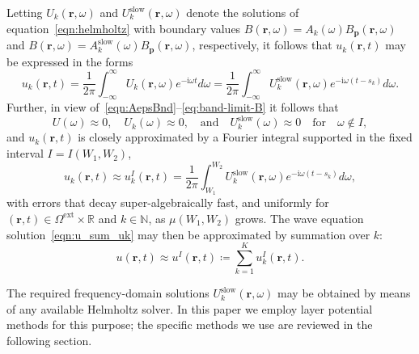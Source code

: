 \documentclass[11pt]{article}
\theoremstyle{plain}
\theoremstyle{remark}
\def \br{\mathbf{r}}
\def \bp{\mathbf{p}}
\begin{document}
Letting $U_k(\br,\omega)$ and $U_k^{\mathrm{slow}}(\br,\omega)$ denote
the solutions of equation~\eqref{eqn:helmholtz} with boundary values
$B(\br,\omega) = A_k(\omega)B_\bp(\br,\omega) $ and
$B(\br,\omega) = A_k^{\mathrm{slow}}(\omega)B_\bp(\br,\omega) $, respectively, it follows that $u_k(\br,t)$ may be expressed
in the forms
\begin{equation}\label{wind_uk}
    u_k(\br,t) = \frac{1}{2\pi}\int_{-\infty}^{\infty}U_k(\br,\omega)e^{-\mathrm{i}\omega t}d\omega = \frac{1}{2\pi}\int_{-\infty}^{\infty}U_k^{\mathrm{slow}}(\br,\omega)e^{-\mathrm{i}\omega (t - s_k)}d\omega.
\end{equation}
Further, in view of~\eqref{eqn:AepsBnd}--\eqref{eq:band-limit-B} it follows that
\begin{equation}
  \label{eq:band-limit-U}
  U(\omega) \approx 0,\quad U_k(\omega) \approx 0,\quad \mbox{and} \quad  U_k^\mathrm{slow}(\omega) \approx 0 \quad \mbox{for} \quad\omega\not\in I,
\end{equation}
and $u_k(\br,t)$ is closely approximated by a
Fourier integral supported in the fixed interval $I=I(W_1,W_2)$,
\begin{equation}\label{eqn:ukw}
    u_k(\br,t) \approx u^{I}_k(\br,t) = \frac{1}{2\pi}\int_{W_1}^{W_2}U_k^{\mathrm{slow}}(\br,\omega)e^{-\mathrm{i}\omega (t - s_k)}d\omega,
\end{equation}
with errors that decay super-algebraically fast, and uniformly for
$(\br,t)\in \Omega^\mathrm{ext}\times\mathbb{R}$ and $k\in\mathbb{N}$,
as $\mu(W_1,W_2)$ grows. The wave equation
solution~\eqref{eqn:u_sum_uk} may then be approximated by summation over $k$:
\begin{equation}\label{eqn:uab}
    u(\br,t) \approx u^{I}(\br,t) \coloneq \sum_{k=1}^K u^{I}_k(\br,t).
\end{equation}

The required frequency-domain solutions
$U_k^{\mathrm{slow}}(\br,\omega)$ may be obtained by means of any
available Helmholtz solver. In this paper we employ layer potential
methods for this purpose; the specific methods we use are reviewed in
the following section.
\end{document}
